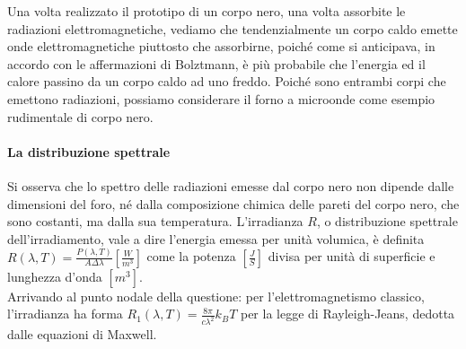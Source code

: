 \documentclass{article}
\begin{document}
 \vspace*{-0.15in}
 \begin{figure}[h]
\centering
{}
\label{fig: cubed graph}
\end{figure}
\vspace*{-0.1}
Una volta realizzato il prototipo di un corpo nero, una volta assorbite le radiazioni elettromagnetiche, vediamo che tendenzialmente un corpo caldo emette onde elettromagnetiche piuttosto che assorbirne, poiché come si anticipava, in accordo con le affermazioni di Bolztmann, è più probabile che l'energia ed il calore passino da un corpo caldo ad uno freddo. Poiché sono entrambi corpi che emettono radiazioni, possiamo considerare il forno a microonde come esempio rudimentale di corpo nero.
\vspace*{-0.12in}
\paragraph{La distribuzione spettrale} Si osserva che lo spettro delle radiazioni emesse dal corpo nero non dipende dalle dimensioni del foro, né dalla composizione chimica delle pareti del corpo nero, che sono costanti,  ma dalla sua temperatura. L'irradianza $R$, o distribuzione spettrale dell'irradiamento, vale a dire l'energia emessa per unità volumica, è definita $R(\lambda, T)= \frac{P(\lambda, T)}{A\Delta \lambda} [\frac{W}{m^3}]$ come la potenza $[\frac{J}{S}]$ divisa per unità di superficie e lunghezza d'onda $[m^3]$. \\
Arrivando al punto nodale della questione: per l'elettromagnetismo classico, l'irradianza ha forma 
$R_1(\lambda, T) = \frac{8\pi}{c \lambda ^2} k_B T$ per la legge di Rayleigh-Jeans, dedotta dalle equazioni di Maxwell. 
\vspace*{-0.07in}
\end{document}

